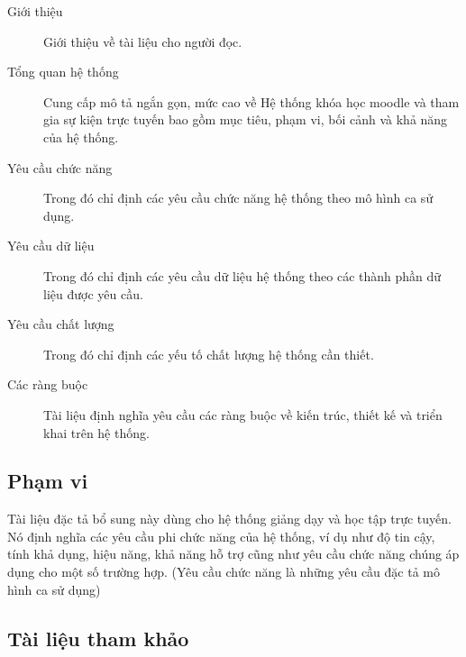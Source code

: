 \documentclass[./../main_file.tex]{subfiles}
\begin{document}
	\begin{description}
		\item[Giới thiệu] Giới thiệu về tài liệu cho người đọc.
		\item[Tổng quan hệ thống] Cung cấp mô tả ngắn gọn, mức cao về Hệ thống khóa học moodle và tham gia sự kiện trực tuyến bao gồm mục tiêu, phạm vi, bối cảnh và khả năng của hệ thống.
		\item[Yêu cầu chức năng] Trong đó chỉ định các yêu cầu chức năng hệ thống theo mô hình ca sử dụng.
		\item[Yêu cầu dữ liệu] Trong đó chỉ định các yêu cầu dữ liệu hệ thống theo các thành phần dữ liệu được yêu cầu.
		\item[Yêu cầu chất lượng] Trong đó chỉ định các yếu tố chất lượng hệ thống cần thiết.
		\item[Các ràng buộc] Tài liệu định nghĩa yêu cầu các ràng buộc về kiến trúc, thiết kế và triển khai trên hệ thống.
		
	\end{description}
	
	\subsection{Phạm vi}
	Tài liệu đặc tả bổ sung này dùng cho hệ thống giảng dạy và học tập trực tuyến. Nó định nghĩa các yêu cầu phi chức năng của hệ thống, ví dụ như độ tin cậy, tính khả dụng, hiệu năng, khả năng hỗ trợ cũng như yêu cầu chức năng chúng áp dụng cho một số trường hợp. (Yêu cầu chức năng là những yêu cầu đặc tả mô hình ca sử dụng)
	
	\subsection{Tài liệu tham khảo}

	\nocite{*}
	\printbibliography[heading=none]
	
	\clearpage
	
\end{document}
